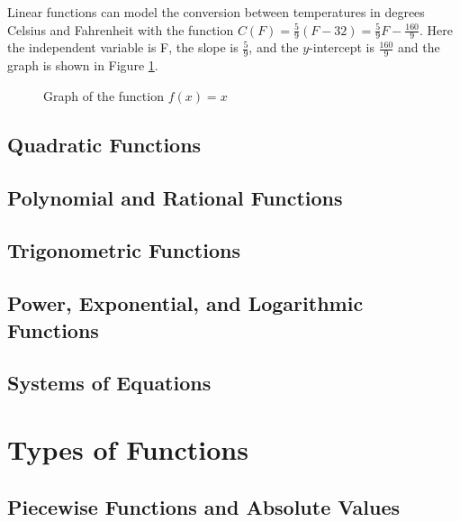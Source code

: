 \begin{example}
    Linear functions can model the conversion between temperatures in degrees Celsius and Fahrenheit with the function $C(F) = \frac{5}{9}(F - 32) = \frac{5}{9}F - \frac{160}{9}$. Here the independent variable is F, the slope is $\frac{5}{9}$, and the $y$-intercept is $\frac{160}{9}$ and the graph is shown in Figure \ref{FtoCgraph}.

    \begin{figure}[!ht]
        \centering
        \label{FtoCgraph}
        \caption{Graph of the function $f(x) = x$}
    \end{figure}
\end{example}

\subsection{Quadratic Functions}
\subsection{Polynomial and Rational Functions}
\subsection{Trigonometric Functions}
\subsection{Power, Exponential, and Logarithmic Functions}
\subsection{Systems of Equations}

\section{Types of Functions}
\subsection{Piecewise Functions and Absolute Values}
